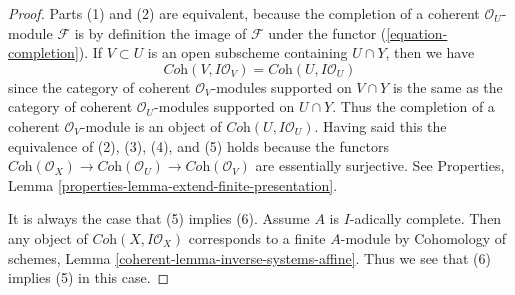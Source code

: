 \begin{proof}
Parts (1) and (2) are equivalent, because the completion of a coherent
$\mathcal{O}_U$-module $\mathcal{F}$ is by definition the image of
$\mathcal{F}$ under the functor (\ref{equation-completion}).
If $V \subset U$ is an open subscheme containing $U \cap Y$, then we have
$$
\textit{Coh}(V, I\mathcal{O}_V) =
\textit{Coh}(U, I\mathcal{O}_U)
$$
since the category of coherent $\mathcal{O}_V$-modules supported on
$V \cap Y$ is the same as the category of coherent $\mathcal{O}_U$-modules
supported on $U \cap Y$. Thus the completion of a coherent
$\mathcal{O}_V$-module is an object of $\textit{Coh}(U, I\mathcal{O}_U)$.
Having said this the equivalence of (2), (3), (4), and (5)
holds because the functors
$\textit{Coh}(\mathcal{O}_X) \to \textit{Coh}(\mathcal{O}_U) \to
\textit{Coh}(\mathcal{O}_V)$ are essentially surjective.
See Properties, Lemma \ref{properties-lemma-extend-finite-presentation}.

\medskip\noindent
It is always the case that (5) implies (6). Assume $A$ is $I$-adically complete.
Then any object of $\textit{Coh}(X, I\mathcal{O}_X)$ corresponds to a finite
$A$-module by Cohomology of schemes, Lemma
\ref{coherent-lemma-inverse-systems-affine}.
Thus we see that (6) implies (5) in this case.
\end{proof}

